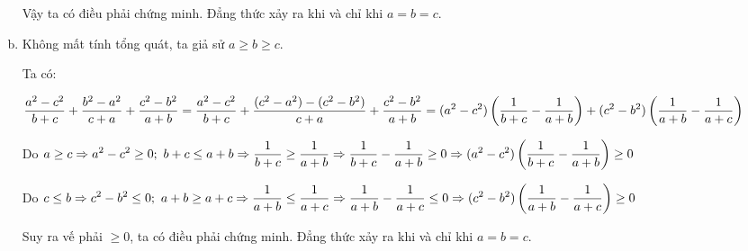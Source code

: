 \begin{problem}
\begin{enumerate}[a)]
		Vậy ta có điều phải chứng minh. Đẳng thức xảy ra khi và chỉ khi $a = b = c$.

		\item
		Không mất tính tổng quát, ta giả sử $a \ge b \ge c$.

		Ta có:

		$\displaystyle \frac{a^2 - c^2}{b + c} + \frac{b^2 - a^2}{c + a} + \frac{c^2 - b^2}{a + b} = \frac{a^2 - c^2}{b + c} + \frac{(c^2 - a^2) - (c^2 - b^2)}{c + a} + \frac{c^2 - b^2}{a + b} \\ = (a^2 - c^2)\left(\frac{1}{b + c} - \frac{1}{a + b}\right) + 
		(c^2 - b^2)\left(\frac{1}{a + b} - \frac{1}{a + c} \right)$

		Do $\displaystyle a \ge c \Rightarrow a^2 - c^2 \ge 0;\ b + c \le a + b \Rightarrow \frac{1}{b + c} \ge \frac{1}{a + b} \Rightarrow \frac{1}{b + c} - \frac{1}{a + b} \ge 0 \\ \Rightarrow (a^2 - c^2)\left(\frac{1}{b + c} - \frac{1}{a + b}\right) \ge 0$

		Do $\displaystyle c \le b \Rightarrow c^2 - b^2 \le 0;\ a + b \ge a + c \Rightarrow 
		\frac{1}{a + b} \le \frac{1}{a + c} \Rightarrow \frac{1}{a + b} - \frac{1}{a + c} \le 0\\\Rightarrow (c^2 - b^2)\left(\frac{1}{a + b} - \frac{1}{a + c} \right) \ge 0$

		Suy ra vế phải $\ge 0$, ta có điều phải chứng minh. Đẳng thức xảy ra khi và chỉ khi $a = b = c$.
	\end{enumerate}
\end{problem}